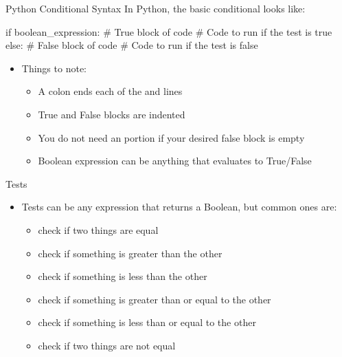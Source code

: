 \documentclass[pdf, aspectratio=169, 12pt]{beamer}
\begin{document}
\begin{frame}[fragile]{Python Conditional Syntax}
	\vspace{5mm}
	In Python, the basic conditional looks like:
	\begin{pythoncode}
		if boolean_expression:
			# True block of code
			# Code to run if the test is true
		else:
			# False block of code
			# Code to run if the test is false
	\end{pythoncode}

	\begin{itemize}
		\item Things to note:
			\begin{itemize}
				\item A colon \pyi{:} ends each of the  and  lines
				\item True and False blocks are \alert{indented}
				\item You do not need an  portion if your desired false block is empty
				\item Boolean expression can be anything that evaluates to True/False
			\end{itemize}
	\end{itemize}
\end{frame}

\begin{frame}{Tests}
	\begin{itemize}
		\item Tests can be any expression that returns a Boolean, but common ones are:
			\begin{itemize}
				\item \pyi{==} \hspace{5mm} check if two things are equal
				\item \pyi{ >} \hspace{5mm} check if something is greater than the other
				\item \pyi{ <} \hspace{5mm} check if something is less than the other
				\item \pyi{>=} \hspace{5mm} check if something is greater than or equal to the other
				\item \pyi{<=} \hspace{5mm} check if something is less than or equal to the other
				\item \pyi{!=} \hspace{5mm} check if two things are not equal
			\end{itemize}
	\end{itemize}
\end{frame}
\end{document}

